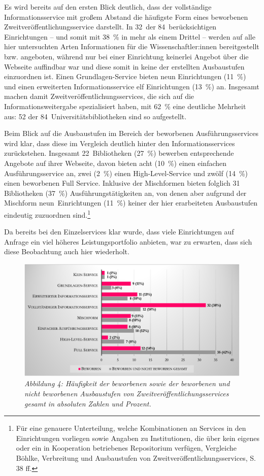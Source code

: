 \documentclass[a4paper,
fontsize=11pt,
oneside,
numbers=noperiodatend,
parskip=half-,
bibliography=totoc,
final
]{scrartcl}
\begin{document}
Es wird bereits auf den ersten Blick deutlich, dass der vollständige
Informationsservice mit großem Abstand die häufigste Form eines
beworbenen Zweitveröffentlichungsservice darstellt. In 32~der
84~berücksichtigen Einrichtungen -- und somit mit 38~\% in mehr als
einem Drittel -- werden auf alle hier untersuchten Arten Informationen
für die Wissenschaftler:innen bereitgestellt bzw. angeboten, während nur
bei einer Einrichtung keinerlei Angebot über die Webseite auffindbar war
und diese somit in keine der erstellten Ausbaustufen einzuordnen ist.
Einen Grundlagen-Service bieten neun Einrichtungen (11~\%) und einen
erweiterten Informationsservice elf Einrichtungen (13~\%) an. Insgesamt
machen damit Zweitveröffentlichungsservices, die sich auf die
Informationsweitergabe spezialisiert haben, mit 62~\% eine deutliche
Mehrheit aus: 52 der 84~Universitätsbibliotheken sind so aufgestellt.

Beim Blick auf die Ausbaustufen im Bereich der beworbenen
Ausführungsservices wird klar, dass diese im Vergleich deutlich hinter
den Informationsservices zurückstehen. Insgesamt 22~Bibliotheken (27~\%)
bewerben entsprechende Angebote auf ihrer Webseite, davon bieten acht
(10~\%) einen einfachen Ausführungsservice an, zwei (2~\%) einen
High-Level-Service und zwölf (14~\%) einen beworbenen Full Service.
Inklusive der Mischformen bieten folglich 31 Bibliotheken (37~\%)
Ausführungstätigkeiten an, von denen aber aufgrund der Mischform
neun~Einrichtungen (11~\%) keiner der hier erarbeiteten Ausbaustufen
eindeutig zuzuordnen sind.\footnote{Für eine genauere Unterteilung,
  welche Kombinationen an Services in den Einrichtungen vorliegen sowie
  Angaben zu Institutionen, die über kein eigenes oder ein in
  Kooperation betriebenes Repositorium verfügen, Vergleiche Böhlke,
  Verbreitung und Ausbaustufen von Zweitveröffentlichungsservices, S. 38
  ff.}

Da bereits bei den Einzelservices klar wurde, dass viele Einrichtungen
auf Anfrage ein viel höheres Leistungsportfolio anbieten, war zu
erwarten, dass sich diese Beobachtung auch hier wiederholt.

\begin{figure}[h!]
\centering
\includegraphics[width=.9\textwidth]{img/abb4.png}
\caption{\textit{Abbildung 4: Häufigkeit der beworbenen sowie der beworbenen und
nicht beworbenen Ausbaustufen von Zweitveröffentlichungsservices gesamt
in absoluten Zahlen und Prozent.}}
\end{figure}
\end{document}
